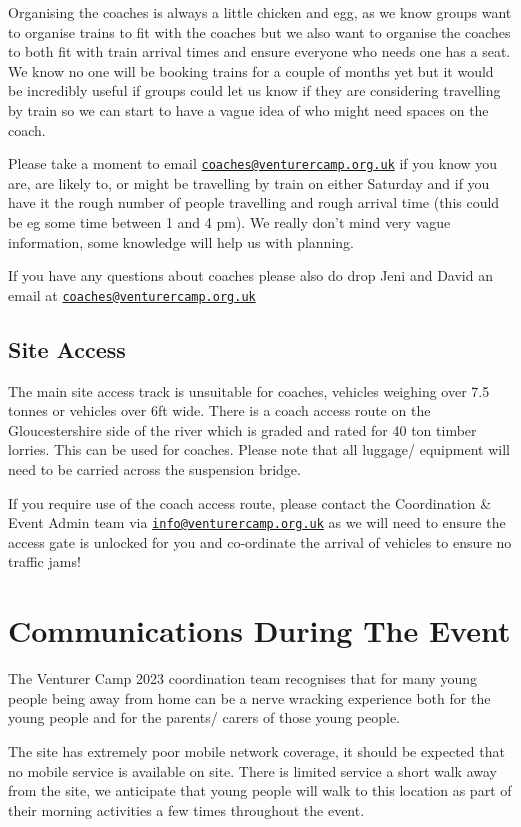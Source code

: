 \documentclass[a4paper, 11pt]{report}
\newcommand{\nl}{\newline}
\begin{document}
Organising the coaches is always a little chicken and egg, as we know groups want to organise trains to fit with the coaches but we also want to organise the coaches to both fit with train arrival times and ensure everyone who needs one has a seat. We know no one will be booking trains for a couple of months yet but it would be incredibly useful if groups could let us know if they are considering travelling by train so we can start to have a vague idea of who might need spaces on the coach. \nl

Please take a moment to email \href{mailto:coaches@venturercamp.org.uk}{\texttt{coaches@venturercamp.org.uk}} if you know you are, are likely to, or might be travelling by train on either Saturday and if you have it the rough number of people travelling and rough arrival time (this could be eg some time between 1 and 4 pm). We really don't mind very vague information, some knowledge will help us with planning.

If you have any questions about coaches please also do drop Jeni and David an email at \href{mailto:coaches@venturercamp.org.uk}{\texttt{coaches@venturercamp.org.uk}}

\section{Site Access}
The main site access track is unsuitable for coaches, vehicles weighing over 7.5 tonnes or vehicles over 6ft wide. There is a coach access route on the Gloucestershire side of the river which is graded and rated for 40 ton timber lorries. This can be used for coaches. Please note that all luggage/ equipment will need to be carried across the suspension bridge.\nl

If you require use of the coach access route, please contact the Coordination \& Event Admin team via \href{mailto:info@venturercamp.org.uk}{\texttt{info@venturercamp.org.uk}} as we will need to ensure the access gate is unlocked for you and co-ordinate the arrival of vehicles to ensure no traffic jams!

\chapter{Communications During The Event}
The Venturer Camp 2023 coordination team recognises that for many young people being away from home can be a nerve wracking experience both for the young people and for the parents/ carers of those young people.\nl

The site has extremely poor mobile network coverage, it should be expected that no mobile service is available on site. There is limited service a short walk away from the site, we anticipate that young people will walk to this location as part of their morning activities a few times throughout the event.\nl
\end{document}
